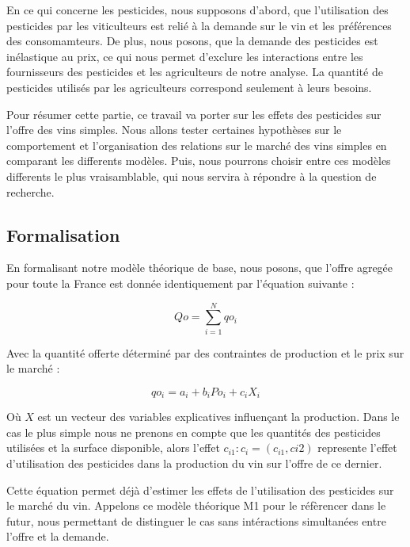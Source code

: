 \documentclass[11pt,]{article}
\begin{document}
En ce qui concerne les pesticides, nous supposons d'abord, que
l'utilisation des pesticides par les viticulteurs est relié à la demande
sur le vin et les préférences des consomamteurs. De plus, nous posons,
que la demande des pesticides est inélastique au prix, ce qui nous
permet d'exclure les interactions entre les fournisseurs des pesticides
et les agriculteurs de notre analyse. La quantité de pesticides utilisés
par les agriculteurs correspond seulement à leurs besoins.

Pour résumer cette partie, ce travail va porter sur les effets des
pesticides sur l'offre des vins simples. Nous allons tester certaines
hypothèses sur le comportement et l'organisation des relations sur le
marché des vins simples en comparant les differents modèles. Puis, nous
pourrons choisir entre ces modèles differents le plus vraisamblable, qui
nous servira à répondre à la question de recherche.

\hypertarget{formalisation}{%
\subsection{Formalisation}\label{formalisation}}

En formalisant notre modèle théorique de base, nous posons, que l'offre
agregée pour toute la France est donnée identiquement par l'équation
suivante :

\begin{equation}
    Qo = \sum_{i = 1}^{N} qo_i
\end{equation}

Avec la quantité offerte déterminé par des contraintes de production et
le prix sur le marché :

\begin{equation}
    qo_i = a_i + b_i Po_i + c_i X_i
\end{equation}

Où \(X\) est un vecteur des variables explicatives influençant la
production. Dans le cas le plus simple nous ne prenons en compte que les
quantités des pesticides utilisées et la surface disponible, alors
l'effet \(c_{i1} : c_i = (c_{i1}, c{i2})\) represente l'effet
d'utilisation des pesticides dans la production du vin sur l'offre de ce
dernier.

Cette équation permet déjà d'estimer les effets de l'utilisation des
pesticides sur le marché du vin. Appelons ce modèle théorique M1 pour le
réfèrencer dans le futur, nous permettant de distinguer le cas sans
intéractions simultanées entre l'offre et la demande.
\end{document}
